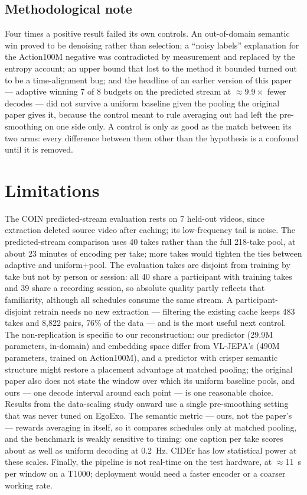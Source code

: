 \documentclass[journal]{IEEEtran}
\begin{document}
\subsection{Methodological note}
Four times a positive result failed its own controls. An out-of-domain semantic
win proved to be denoising rather than selection; a ``noisy labels'' explanation
for the Action100M negative was contradicted by measurement and replaced by the
entropy account; an upper bound that lost to the method it bounded turned out to
be a time-alignment bug; and the headline of an earlier version of this paper ---
adaptive winning 7 of 8 budgets on the predicted stream at $\approx 9.9\times$
fewer decodes --- did not survive a uniform baseline given the pooling the original
paper gives it, because the control meant to rule averaging out had left the
pre-smoothing on one side only. A control is only as good as the match between its
two arms: every difference between them other than the hypothesis is a confound
until it is removed.

\section{Limitations}
The COIN predicted-stream evaluation rests on 7 held-out videos, since extraction
deleted source video after caching; its low-frequency tail is noise. The
predicted-stream comparison uses 40 takes rather than the full 218-take pool, at
about 23 minutes of encoding per take; more takes would tighten the ties between
adaptive and uniform+pool. The evaluation takes are disjoint from training by take
but not by person or session: all 40 share a participant with training takes and
39 share a recording session, so absolute quality partly reflects that
familiarity, although all schedules consume the same stream. A participant-disjoint
retrain needs no new extraction --- filtering the existing cache keeps 483 takes
and 8{,}822 pairs, 76\% of the data --- and is the most useful next control. The
non-replication is specific to our reconstruction: our predictor (29.9M
parameters, in-domain) and embedding space differ from VL-JEPA's (490M parameters,
trained on Action100M), and a predictor with crisper semantic structure might
restore a placement advantage at matched pooling; the original paper also does not
state the window over which its uniform baseline pools, and ours --- one decode
interval around each point --- is one reasonable choice. Results from the
data-scaling study onward use a single pre-smoothing setting that was never tuned
on EgoExo. The semantic metric --- ours, not the paper's --- rewards averaging in
itself, so it compares schedules only at matched pooling, and the benchmark is
weakly sensitive to timing: one caption per take scores about as well as uniform
decoding at 0.2~Hz. CIDEr has low statistical power at these scales. Finally, the
pipeline is not real-time on the test hardware, at $\approx$11~s per window on a
T1000; deployment would need a faster encoder or a coarser working rate.
\end{document}
